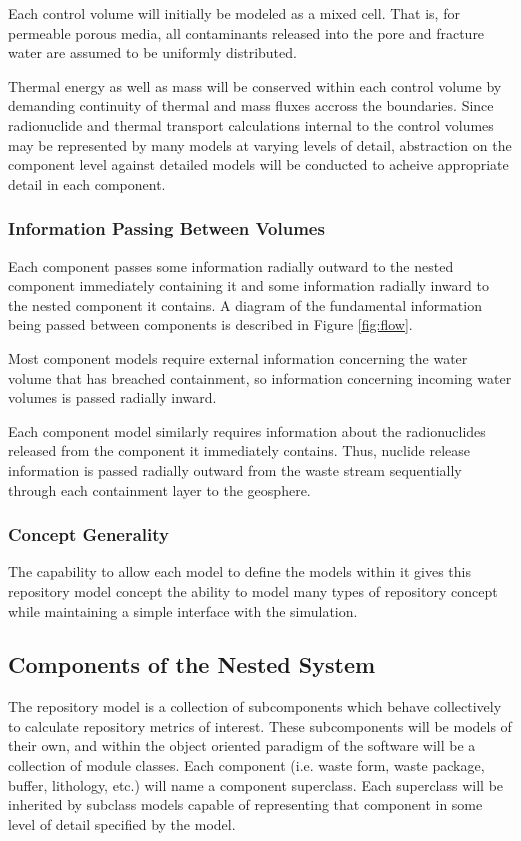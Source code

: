 Each control volume will initially be modeled as a mixed cell. That is, for 
permeable porous media, all contaminants released into the pore and fracture 
water are assumed to be uniformly distributed.

Thermal energy as well as mass will be conserved within each control volume by 
demanding continuity of thermal and mass fluxes accross the boundaries. Since 
radionuclide and thermal transport calculations internal to the control volumes  
may be represented by many models at varying levels of detail, abstraction on 
the component level against detailed models will be conducted to acheive 
appropriate detail in each component. 

\subsubsection{Information Passing Between Volumes}

Each component passes some information radially outward to the nested 
component immediately containing it and some information radially 
inward to the nested component it contains. A diagram of the fundamental
information being passed between components is described in Figure 
\ref{fig:flow}.

Most component models require external information concerning the 
water volume that has breached containment, so information concerning 
incoming water volumes is passed radially inward. 

Each component model similarly requires information about the radionuclides 
released from the component it immediately contains.  Thus, nuclide 
release information is passed radially outward from the waste stream 
sequentially through each containment layer to the geosphere.

\subsubsection{Concept Generality}

The capability to allow each model to define the models within it gives this 
repository model concept the ability to model many types of repository concept 
while maintaining a simple interface with the simulation. 

\subsection{Components of the Nested System}

The repository model is a collection of subcomponents which behave collectively 
to calculate repository metrics of interest. These subcomponents will be models 
of their own, and within the object oriented paradigm of the software will be 
a collection of module classes. Each component (i.e. waste form, waste 
package, buffer, lithology, etc.) will name a component superclass. Each superclass 
will be inherited by subclass models capable of representing that component in 
some level of detail specified by the model.

